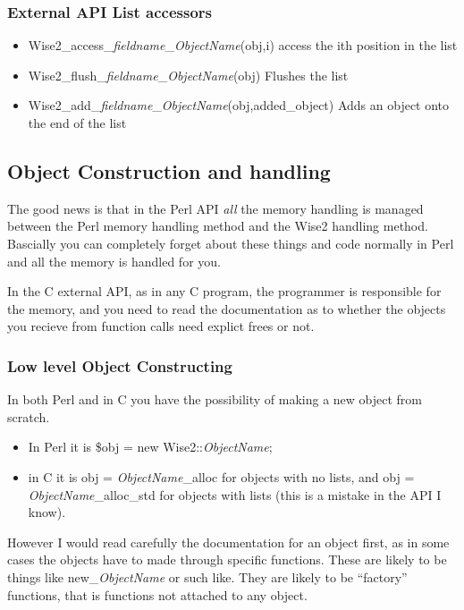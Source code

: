 \subsubsection{External API List accessors}

\begin{itemize}
\item Wise2\_access\_\emph{fieldname}\_\emph{ObjectName}(obj,i) access the ith position in the list
\item Wise2\_flush\_\emph{fieldname}\_\emph{ObjectName}(obj) Flushes the list
\item Wise2\_add\_\emph{fieldname}\_\emph{ObjectName}(obj,added\_object) Adds an object onto the end of the list
\end{itemize}

\subsection{Object Construction and handling}

The good news is that in the Perl API \emph{all} the memory handling is managed
between the Perl memory handling method and the Wise2 handling method. Bascially
you can completely forget about these things and code normally in Perl and
all the memory is handled for you.

In the C external API, as in any C program, the programmer is responsible for the
memory, and you need to read the documentation as to whether the objects you 
recieve from function calls need explict frees or not.

\subsubsection{Low level Object Constructing}

In both Perl and in C you have the possibility of making a new object from scratch.

\begin{itemize}
\item In Perl it is \$obj = new Wise2::\emph{ObjectName};
\item in C it is obj = \emph{ObjectName}\_alloc for objects with no lists, and obj = \emph{ObjectName}\_alloc\_std 
for objects with lists (this is a mistake in the API I know).
\end{itemize}

However I would read carefully the documentation for an object first, as in some cases the
objects have to made through specific functions. These are likely to be things like
new\_\emph{ObjectName} or such like. They are likely to be ``factory'' functions, that is
functions not attached to any object. 

